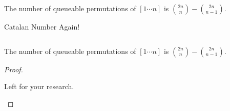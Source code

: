 \begin{frame}{}
  \begin{theorem}
    The number of queueable permutations of $[1 \cdots n]$ is ${2n \choose n} - {2n \choose n-1}$.
  \end{theorem}

  \pause
  \vspace{0.10cm}
  \centerline{\large Catalan Number Again!}

  \begin{columns}
    \pause
    \pause
  \end{columns}
\end{frame}

\begin{frame}{}
  \begin{theorem}
    The number of queueable permutations of $[1 \cdots n]$ is ${2n \choose n} - {2n \choose n-1}$.
  \end{theorem}

  \vspace{0.30cm}
  \begin{proof}
    \begin{center}
      {\Large Left for your research.}
    \end{center}

    \pause
  \end{proof}
\end{frame}

